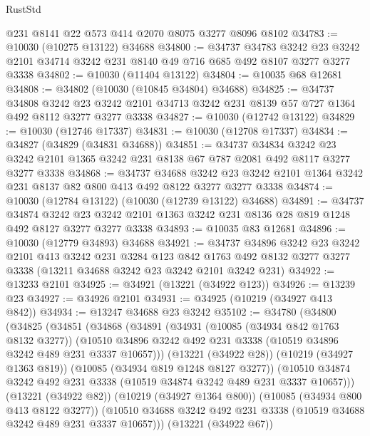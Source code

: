 \begin{lexlean}{RustStd}
\begin{coremodule}
    @231
    @8141
    @22
    @573
    @414
    @2070
    @8075
    @3277
    @8096
    @8102
@34783 := @10030 (@10275 @13122) @34688
@34800 := @34737
    @34783
    @3242
    @23
    @3242
    @2101
    @34714
    @3242
    @231
    @8140
    @49
    @716
    @685
    @492
    @8107
    @3277
    @3277
    @3338
@34802 := @10030 (@11404 @13122)
@34804 := @10035 @68 @12681
@34808 := @34802 (@10030 (@10845 @34804) @34688)
@34825 := @34737
    @34808
    @3242
    @23
    @3242
    @2101
    @34713
    @3242
    @231
    @8139
    @57
    @727
    @1364
    @492
    @8112
    @3277
    @3277
    @3338
@34827 := @10030 (@12742 @13122)
@34829 := @10030 (@12746 @17337)
@34831 := @10030 (@12708 @17337)
@34834 := @34827 (@34829 (@34831 @34688))
@34851 := @34737
    @34834
    @3242
    @23
    @3242
    @2101
    @1365
    @3242
    @231
    @8138
    @67
    @787
    @2081
    @492
    @8117
    @3277
    @3277
    @3338
@34868 := @34737
    @34688
    @3242
    @23
    @3242
    @2101
    @1364
    @3242
    @231
    @8137
    @82
    @800
    @413
    @492
    @8122
    @3277
    @3277
    @3338
@34874 := @10030 (@12784 @13122) (@10030 (@12739 @13122) @34688)
@34891 := @34737
    @34874
    @3242
    @23
    @3242
    @2101
    @1363
    @3242
    @231
    @8136
    @28
    @819
    @1248
    @492
    @8127
    @3277
    @3277
    @3338
@34893 := @10035 @83 @12681
@34896 := @10030 (@12779 @34893) @34688
@34921 := @34737
    @34896
    @3242
    @23
    @3242
    @2101
    @413
    @3242
    @231
    @3284
    @123
    @842
    @1763
    @492
    @8132
    @3277
    @3277
    @3338
    (@13211 @34688 @3242 @23 @3242 @2101 @3242 @231)
@34922 := @13233 @2101
@34925 := @34921 (@13221 (@34922 @123))
@34926 := @13239 @23
@34927 := @34926 @2101
@34931 := @34925 (@10219 (@34927 @413 @842))
@34934 := @13247 @34688 @23 @3242
@35102 := @34780
    (@34800
      (@34825
        (@34851
          (@34868
            (@34891
              (@34931
                (@10085 (@34934 @842 @1763 @8132 @3277))
                (@10510 @34896 @3242 @492 @231 @3338 (@10519 @34896 @3242 @489 @231 @3337 @10657)))
              (@13221 (@34922 @28))
              (@10219 (@34927 @1363 @819))
              (@10085 (@34934 @819 @1248 @8127 @3277))
              (@10510 @34874 @3242 @492 @231 @3338 (@10519 @34874 @3242 @489 @231 @3337 @10657)))
            (@13221 (@34922 @82))
            (@10219 (@34927 @1364 @800))
            (@10085 (@34934 @800 @413 @8122 @3277))
            (@10510 @34688 @3242 @492 @231 @3338 (@10519 @34688 @3242 @489 @231 @3337 @10657)))
          (@13221 (@34922 @67))

\end{coremodule}
\end{lexlean}
